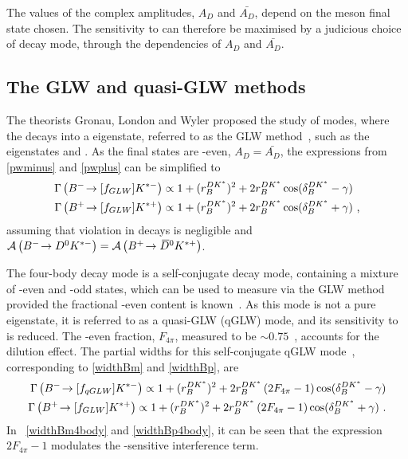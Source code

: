 The values of the complex amplitudes, $A_{D}$ and $\bar{A_{D}}$, depend on the \D meson final state chosen. The sensitivity to \Pgamma can therefore be maximised by a judicious choice of \Dz decay mode, through the dependencies of $A_{D}$ and $\bar{A_{D}}$.

\subsection{The GLW and quasi-GLW methods}
\label{sec:theory:glw}

The theorists Gronau, London and Wyler proposed the study of \decay{\Bm}{\D\Km} modes, where the \D decays into a \CP eigenstate, referred to as the GLW method~\cite{GL,GW}, such as the eigenstates \decay{\Dz}{\Kp\Km} and \decay{\Dz}{\pip\pim}. As the final states are \CP-even, $A_{D} = \bar{A_{D}}$, the expressions from \eqn\ref{pwminus} and \ref{pwplus} can be simplified to
\begin{align}
\Gamma\left({{{B}^-}}\!\rightarrow [f_{GLW}]{\ensuremath{{K}^{*-}}}\right) &\propto 1 + (r_B^{DK^*})^2 + 2r_B^{DK^*}\cos(\delta_B^{DK^*} - \gamma) \label{widthBm} \\
\Gamma\left({{{B}^+}}\!\rightarrow [f_{GLW}]{\ensuremath{{K}^{*+}}}\right) &\propto 1 + (r_B^{DK^*})^2 + 2r_B^{DK^*}\cos(\delta_B^{DK^*} + \gamma) \text { ,}\label{widthBp}
\end{align}
assuming that \CP violation in \D decays is negligible and $\mathcal{A}\left({{{B}^-}}\!\rightarrow {\ensuremath{{D}^0}}{\ensuremath{{K}^{*-}}}\right) = \mathcal{A}\left({{{B}^+}}\!\rightarrow {\ensuremath{{\kern 0.2em\overline{\kern -0.2em D}{}}{}^0}}{\ensuremath{{K}^{*+}}}\right)$. 

The four-body \D decay mode \decay{\D}{\pip\pim\pip\pim} is a self-conjugate decay mode, containing a mixture of \CP-even and \CP-odd states, which can be used to measure \Pgamma via the GLW method provided the fractional \CP-even content is known~\cite{NAYAK20151}. As this mode is not a pure \CP eigenstate, it is referred to as a quasi-GLW (qGLW) mode, and its sensitivity to \Pgamma is reduced. The \CP-even fraction, $F_{4\pi}$, measured to be $\sim 0.75$~\cite{charm4pi}, accounts for the dilution effect. The partial widths for this self-conjugate qGLW mode~\cite{NAYAK20151,charm4pi}, corresponding to \eqn\ref{widthBm} and \ref{widthBp}, are
\begin{align}
\Gamma\left({{{B}^-}}\!\rightarrow [f_{qGLW}]{\ensuremath{{K}^{*-}}}\right) \propto 1 + (r_B^{DK^*})^2 + 2r_B^{DK^*}\left(2F_{4\pi} - 1\right)\cos(\delta_B^{DK^*} - \gamma) \label{widthBm4body} \\
\Gamma\left({{{B}^+}}\!\rightarrow [f_{GLW}]{\ensuremath{{K}^{*+}}}\right) \propto 1 + (r_B^{DK^*})^2 + 2r_B^{DK^*}\left(2F_{4\pi} - 1\right)\cos(\delta_B^{DK^*} + \gamma) \text { .} \label{widthBp4body}
\end{align}
In \eqn~\ref{widthBm4body} and \ref{widthBp4body}, it can be seen that the expression $2F_{4\pi} - 1$ modulates the \Pgamma-sensitive interference term.


